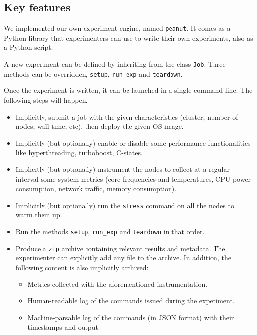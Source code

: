         \subsection{Key features}%
        \label{sub:key_features}
            We implemented our own experiment engine, named \texttt{peanut}. It comes as a Python library that
            experimenters can use to write their own experiments, also as a Python script.

            A new experiment can be defined by inheriting from the class \texttt{Job}. Three methods can be overridden,
            \texttt{setup}, \texttt{run\_exp} and \texttt{teardown}.

            Once the experiment is written, it can be launched in a single command line. The following steps will
            happen.
            \begin{itemize}
                \item Implicitly, submit a job with the given characteristics (\eg cluster, number of nodes, wall time,
                    etc), then deploy the given OS image.
                \item Implicitly (but optionally) enable or disable some performance functionalities like
                    hyperthreading, turboboost, C-states.
                \item Implicitly (but optionally) instrument the nodes to collect at a regular interval some system
                    metrics (\eg core frequencies and temperatures, CPU power consumption, network traffic, memory
                    consumption).
                \item Implicitly (but optionally) run the \texttt{stress} command on all the nodes to warm them up.
                \item Run the methods \texttt{setup}, \texttt{run\_exp} and \texttt{teardown} in that order.
                \item Produce a \texttt{zip} archive containing relevant results and metadata. The experimenter can
                    explicitly add any file to the archive. In addition, the following content is also implicitly
                    archived:
                    \begin{itemize}
                        \item Metrics collected with the aforementioned instrumentation.
                        \item Human-readable log of the commands issued during the experiment.
                        \item Machine-parsable log of the commands (in JSON format) with their timestamps and output

\end{itemize}
\end{itemize}
